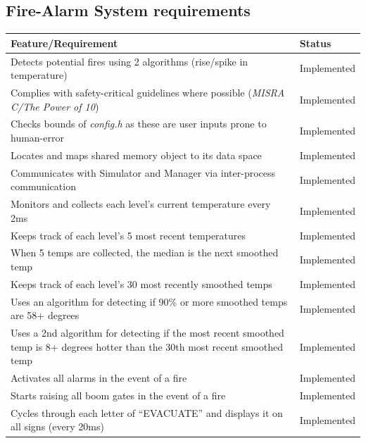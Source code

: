 \documentclass[a4paper]{article}
\begin{document}
\subsection{Fire-Alarm System requirements}
\begin{tabular}{|m{24.7em}|l|}
  \hline
  \cellcolor{gray!10} \textbf{Feature\slash Requirement} & \cellcolor{gray!10} \textbf{Status}\\
  \hline
  Detects potential fires using 2 algorithms (rise/spike in temperature) & \cellcolor{green!40}Implemented\\
  \hline
  Complies with safety-critical guidelines where possible (\emph{MISRA C/The Power of 10}) & \cellcolor{green!40}Implemented\\
  \hline
  Checks bounds of \emph{config.h} as these are user inputs prone to human-error & \cellcolor{green!40}Implemented\\
  \hline
  Locates and maps shared memory object to its data space & \cellcolor{green!40}Implemented\\
  \hline
  Communicates with Simulator and Manager via inter-process communication & \cellcolor{green!40}Implemented\\
  \hline
  Monitors and collects each level's current temperature every 2ms & \cellcolor{green!40}Implemented\\
  \hline
  Keeps track of each level's 5 most recent temperatures & \cellcolor{green!40}Implemented\\
  \hline
  When 5 temps are collected, the median is the next smoothed temp & \cellcolor{green!40}Implemented\\
  \hline
  Keeps track of each level's 30 most recently smoothed temps & \cellcolor{green!40}Implemented\\
  \hline
  Uses an algorithm for detecting if 90\% or more smoothed temps are 58+ degrees & \cellcolor{green!40}Implemented\\
  \hline
  Uses a 2nd algorithm for detecting if the most recent smoothed temp is 8+ degrees hotter than the 30th most recent smoothed temp & \cellcolor{green!40}Implemented\\
  \hline
  Activates all alarms in the event of a fire & \cellcolor{green!40}Implemented\\
  \hline
  Starts raising all boom gates in the event of a fire & \cellcolor{green!40}Implemented\\
  \hline
  Cycles through each letter of “EVACUATE” and displays it on all signs (every 20ms) & \cellcolor{green!40}Implemented\\
  \hline
\end{tabular}
\end{document}
